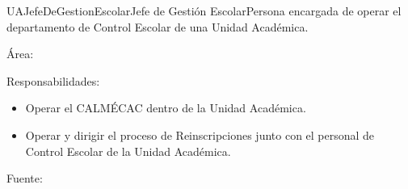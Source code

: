 %
%
%
\begin{actor}{UAJefeDeGestionEscolar}{Jefe de Gestión Escolar}{Persona encargada de operar el departamento de Control Escolar de una Unidad Académica.}
	\item[Área:] 
	\item[Responsabilidades:] \cdtEmpty
		\begin{itemize}
			\item Operar el CALMÉCAC dentro de la Unidad Académica.
			\item Operar y dirigir el proceso de Reinscripciones junto con el personal de Control Escolar de la Unidad Académica.
		\end{itemize}
	\item[Fuente:]
\end{actor}
